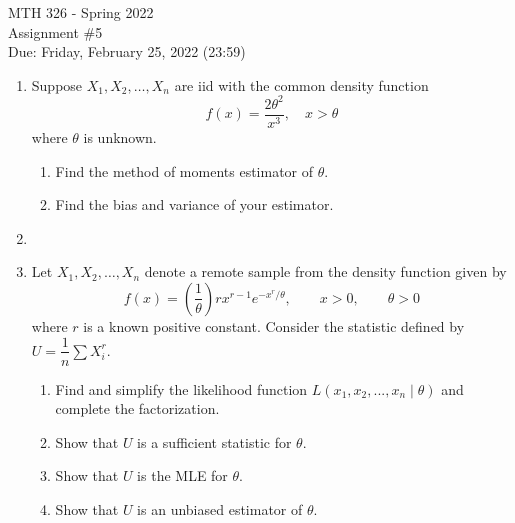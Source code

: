 \documentclass[12pt]{article}
\newcommand{\pover}[1]{\left( \frac{1}{{#1}} \right) } %
\newcommand{\nl}{\vspace{0.1in}\noindent}
\begin{document}
\pagestyle{fancy}
\fancyhf{}

\noindent MTH 326 - Spring 2022
\\Assignment \#5
\\Due: Friday, February 25, 2022 (23:59)\\

\begin{enumerate}
    \item Suppose $X_1, X_2, \dots, X_n$ are iid with the common density function
    $$f(x) = \frac{2\theta^2}{x^3}, \quad x > \theta$$
    where $\theta$ is unknown.
    \begin{enumerate}
        \item Find the method of moments estimator of $\theta$.
        
        \nl 
        \newpage\item Find the bias and variance of your estimator.
        
        \nl 
    \end{enumerate}

    \newpage
    \item 
    
    \newpage
    \item Let $X_1, X_2, \dots, X_n$ denote a remote sample from the density function given by
    $$f(x) = \pover{\theta} rx^{r-1}e^{-x^r/\theta},\qquad x > 0, \qquad \theta > 0$$
    where $r$ is a known positive constant. Consider the statistic defined by $U = \dfrac{1}{n} \sum X_i^r$.
    \begin{enumerate}
        \item Find and simplify the likelihood function $L(x_1,x_2,...,x_n \mid \theta)$ and complete the factorization.
        
        \nl 
\vspace{0.5in}
        \item Show that $U$ is a sufficient statistic for $\theta$.
         
        \nl 

        \newpage  \item Show that $U$ is the MLE for $\theta$.
         
        \nl 

        \vspace{1in}
        \item Show that $U$ is an unbiased estimator of $\theta$.
        

\end{enumerate}
\end{enumerate}
\end{document}
